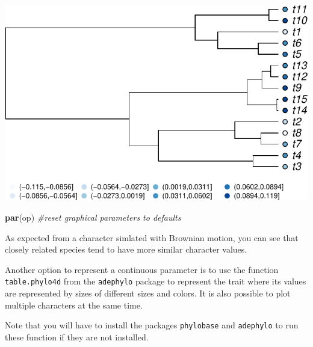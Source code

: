 \documentclass[
]{book}
\newenvironment{Shaded}{\begin{snugshade}}{\end{snugshade}}
\newcommand{\CommentTok}[1]{\textcolor[rgb]{0.56,0.35,0.01}{\textit{#1}}}
\newcommand{\FunctionTok}[1]{\textcolor[rgb]{0.13,0.29,0.53}{\textbf{#1}}}
\newcommand{\NormalTok}[1]{#1}
\begin{document}
\includegraphics{pcm-workshop_files/figure-latex/Plot continuous parameter-1.pdf}

\begin{Shaded}
\begin{Highlighting}[]
\FunctionTok{par}\NormalTok{(op) }\CommentTok{\#reset graphical parameters to defaults}
\end{Highlighting}
\end{Shaded}

As expected from a character simlated with Brownian motion, you can see that closely related species tend to have more similar character values.

Another option to represent a continuous parameter is to use the function \texttt{table.phylo4d} from the \texttt{adephylo} package to represent the trait where its values are represented by sizes of different sizes and colors. It is also possible to plot multiple characters at the same time.

Note that you will have to install the packages \texttt{phylobase} and \texttt{adephylo} to run these function if they are not installed.
\end{document}
